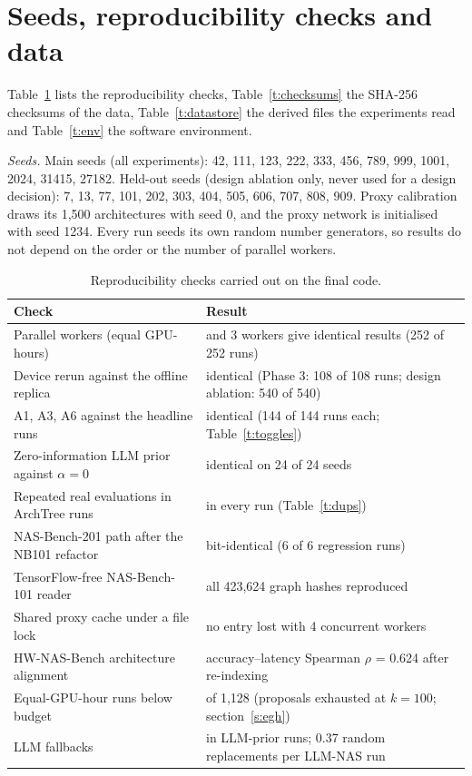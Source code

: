 \documentclass{sadhana}
\newcommand{\algname}{ArchTree}
\begin{document}
\section{Seeds, reproducibility checks and data}\label{s:repro}

Table~\ref{t:checks} lists the reproducibility checks, Table~\ref{t:checksums} the SHA-256 checksums of the data, Table~\ref{t:datastore} the derived files the experiments read and Table~\ref{t:env} the software environment.

\textit{Seeds.} Main seeds (all experiments): 42, 111, 123, 222, 333, 456, 789, 999, 1001, 2024, 31415, 27182. Held-out seeds (design ablation only, never used for a design decision): 7, 13, 77, 101, 202, 303, 404, 505, 606, 707, 808, 909. Proxy calibration draws its 1,500 architectures with seed 0, and the proxy network is initialised with seed 1234. Every run seeds its own random number generators, so results do not depend on the order or the number of parallel workers.

\begin{table}[tbp]
\caption{Reproducibility checks carried out on the final code.}\label{t:checks}
\centering\footnotesize
\begin{tabular}{@{}>{\raggedright\arraybackslash}p{}>{\raggedright\arraybackslash}p{}@{}}
\toprule
Check & Result\\
\midrule
Parallel workers (equal GPU-hours) & 1 and 3 workers give identical results (252 of 252 runs)\\
Device rerun against the offline replica & identical (Phase 3: 108 of 108 runs; design ablation: 540 of 540)\\
A1, A3, A6 against the headline runs & identical (144 of 144 runs each; Table~\ref{t:toggles})\\
Zero-information LLM prior against $\alpha=0$ & identical on 24 of 24 seeds\\
Repeated real evaluations in \algname{} runs & 0 in every run (Table~\ref{t:dups})\\
NAS-Bench-201 path after the NB101 refactor & bit-identical (6 of 6 regression runs)\\
TensorFlow-free NAS-Bench-101 reader & all 423,624 graph hashes reproduced\\
Shared proxy cache under a file lock & no entry lost with 4 concurrent workers\\
HW-NAS-Bench architecture alignment & accuracy--latency Spearman $\rho$ = 0.624 after re-indexing\\
Equal-GPU-hour runs below budget & 5 of 1,128 (proposals exhausted at $k=100$; section~\ref{s:egh})\\
LLM fallbacks & 0 in LLM-prior runs; 0.37 random replacements per LLM-NAS run\\
\bottomrule
\end{tabular}
\end{table}
\end{document}
